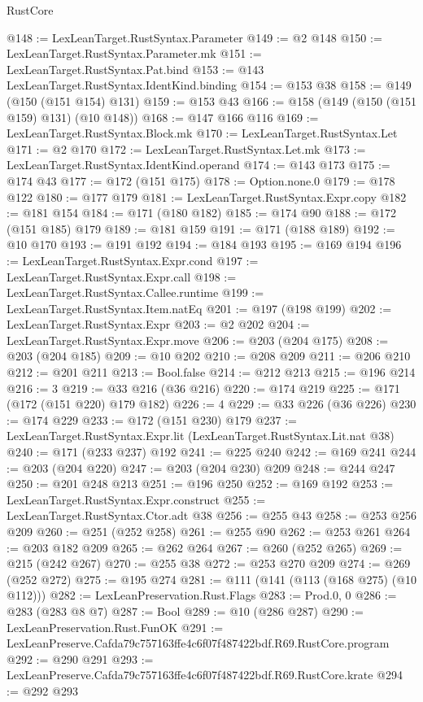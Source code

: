\begin{lexlean}{RustCore}
\begin{coremodule}
@148 := LexLeanTarget.RustSyntax.Parameter
@149 := @2 @148
@150 := LexLeanTarget.RustSyntax.Parameter.mk
@151 := LexLeanTarget.RustSyntax.Pat.bind
@153 := @143 LexLeanTarget.RustSyntax.IdentKind.binding
@154 := @153 @38
@158 := @149 (@150 (@151 @154) @131)
@159 := @153 @43
@166 := @158 (@149 (@150 (@151 @159) @131) (@10 @148))
@168 := @147 @166 @116
@169 := LexLeanTarget.RustSyntax.Block.mk
@170 := LexLeanTarget.RustSyntax.Let
@171 := @2 @170
@172 := LexLeanTarget.RustSyntax.Let.mk
@173 := LexLeanTarget.RustSyntax.IdentKind.operand
@174 := @143 @173
@175 := @174 @43
@177 := @172 (@151 @175)
@178 := Option.none.{0}
@179 := @178 @122
@180 := @177 @179
@181 := LexLeanTarget.RustSyntax.Expr.copy
@182 := @181 @154
@184 := @171 (@180 @182)
@185 := @174 @90
@188 := @172 (@151 @185) @179
@189 := @181 @159
@191 := @171 (@188 @189)
@192 := @10 @170
@193 := @191 @192
@194 := @184 @193
@195 := @169 @194
@196 := LexLeanTarget.RustSyntax.Expr.cond
@197 := LexLeanTarget.RustSyntax.Expr.call
@198 := LexLeanTarget.RustSyntax.Callee.runtime
@199 := LexLeanTarget.RustSyntax.Item.natEq
@201 := @197 (@198 @199)
@202 := LexLeanTarget.RustSyntax.Expr
@203 := @2 @202
@204 := LexLeanTarget.RustSyntax.Expr.move
@206 := @203 (@204 @175)
@208 := @203 (@204 @185)
@209 := @10 @202
@210 := @208 @209
@211 := @206 @210
@212 := @201 @211
@213 := Bool.false
@214 := @212 @213
@215 := @196 @214
@216 := 3
@219 := @33 @216 (@36 @216)
@220 := @174 @219
@225 := @171 (@172 (@151 @220) @179 @182)
@226 := 4
@229 := @33 @226 (@36 @226)
@230 := @174 @229
@233 := @172 (@151 @230) @179
@237 := LexLeanTarget.RustSyntax.Expr.lit (LexLeanTarget.RustSyntax.Lit.nat @38)
@240 := @171 (@233 @237) @192
@241 := @225 @240
@242 := @169 @241
@244 := @203 (@204 @220)
@247 := @203 (@204 @230) @209
@248 := @244 @247
@250 := @201 @248 @213
@251 := @196 @250
@252 := @169 @192
@253 := LexLeanTarget.RustSyntax.Expr.construct
@255 := LexLeanTarget.RustSyntax.Ctor.adt @38
@256 := @255 @43
@258 := @253 @256 @209
@260 := @251 (@252 @258)
@261 := @255 @90
@262 := @253 @261
@264 := @203 @182 @209
@265 := @262 @264
@267 := @260 (@252 @265)
@269 := @215 (@242 @267)
@270 := @255 @38
@272 := @253 @270 @209
@274 := @269 (@252 @272)
@275 := @195 @274
@281 := @111 (@141 (@113 (@168 @275) (@10 @112)))
@282 := LexLeanPreservation.Rust.Flags
@283 := Prod.{0, 0}
@286 := @283 (@283 @8 @7)
@287 := Bool
@289 := @10 (@286 @287)
@290 := LexLeanPreservation.Rust.FunOK
@291 := LexLeanPreserve.Cafda79c757163ffe4c6f07f487422bdf.R69.RustCore.program
@292 := @290 @291
@293 := LexLeanPreserve.Cafda79c757163ffe4c6f07f487422bdf.R69.RustCore.krate
@294 := @292 @293

\end{coremodule}
\end{lexlean}
